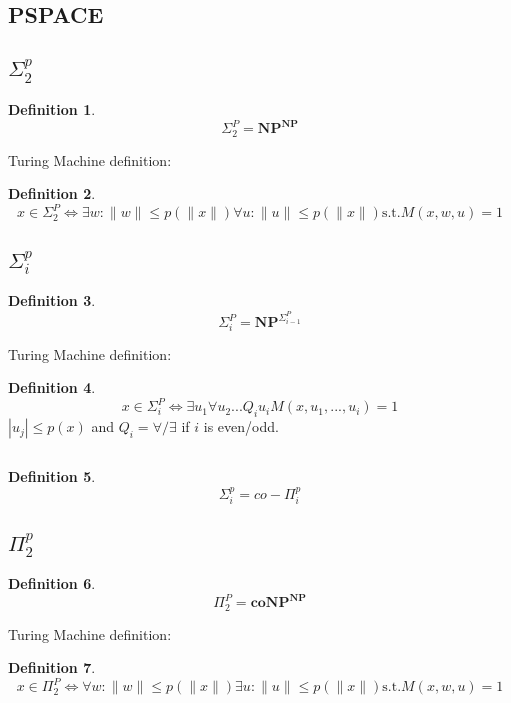 \documentclass[]{article}
\theoremstyle{definition}
\newtheorem{definition}{Definition}[section]
\begin{document}
\subsection{PSPACE}

\subsection{$\Sigma^p_2$}
\label{sec:sigmap2}
\begin{definition}
	$$\Sigma_2^P = \hyperref[sec:NP]{\textbf{NP}^{\textbf{NP}}}$$
\end{definition}
$ $
\\
Turing Machine definition:
\begin{definition}
	$$x \in \Sigma_2^P\iff \exists w : \|w\| \leq p(\|x\|) \forall u : \|u\| \leq p(\|x\|)\text{s.t.} M(x, w,u) = 1$$
\end{definition}
\subsection{$\Sigma^p_i$}
\label{sec:sigmapi}
\begin{definition}
	$$\Sigma_i^P = \hyperref[sec:NP]{\textbf{NP}}^{\hyperref[sec:sigmapi]{\Sigma_{i-1}^P}}$$
\end{definition}
$ $
\\
Turing Machine definition:
\begin{definition}
	$$x \in \Sigma_i^P\iff \exists u_1\forall u_2 ... Q_i u_i M(x,u_1,...,u_i) = 1$$
	$|u_j| \leq p(x)$ and $Q_i=\forall/\exists$ if $i$ is even/odd.
\end{definition}
$ $
\\
\begin{definition}
	$$\Sigma_i^p ={\hyperref[sec:pipi]{co-\Pi_{i}^p}}$$
\end{definition}
\subsection{$\Pi^p_2$}
\label{sec:pip2}
\begin{definition}
	$$\Pi_2^P = \hyperref[sec:coNP]{\textbf{coNP}^{\textbf{NP}}}$$
\end{definition}
$ $
\\
Turing Machine definition:
\begin{definition}
	$$x \in \Pi_2^P\iff \forall w : \|w\| \leq p(\|x\|) \exists u : \|u\| \leq p(\|x\|)\text{s.t.} M(x, w,u) = 1$$
\end{definition}
\end{document}
